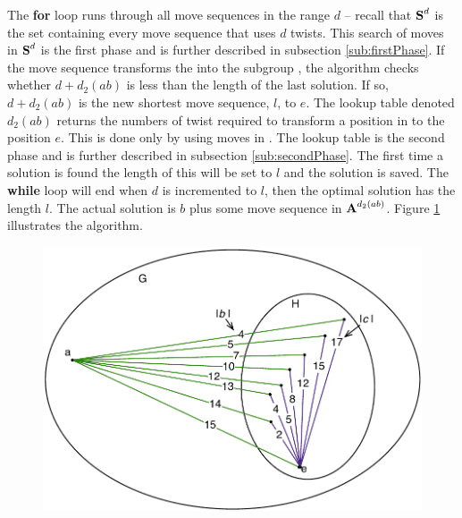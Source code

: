 The \textbf{for} loop runs through all move sequences in the range $d$ -- recall that $\textbf{S}^d$ is the set containing every move sequence that uses $d$ twists. This search of moves in $\textbf{S}^d$ is the first phase and is further described in subsection \ref{sub:firstPhase}.
 If the move sequence transforms the \cube{} into the subgroup , the algorithm checks whether $d + d_2(ab)$ is less than the length of the last solution. 
 If so, $d + d_2(ab)$ is the new shortest move sequence, $l$, to $e$. 
The lookup table denoted $d_2(ab)$ returns the numbers of twist required to transform a position in  to the position $e$. This is done only by using moves in . %
The lookup table is the second phase and is further described in subsection \ref{sub:secondPhase}. 
The first time a solution is found the length of this will be set to $l$ and the solution is saved. The \textbf{while} loop will end when $d$ is incremented to $l$, then the optimal solution has the length $l$. The actual solution is $b$ plus some move sequence in $\textbf{A}^{d_{2}(ab)}$. Figure \ref{fig:kociemba2} illustrates the algorithm.
\begin{figure}[hb]
	\centering
	\includegraphics[scale=0.7]{input/pics/kocieambe2.pdf}
	\caption{}
	\label{fig:kociemba2}
\end{figure}

